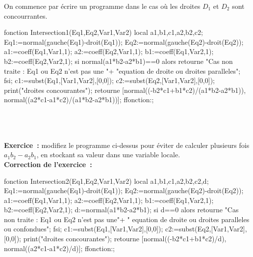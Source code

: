 \documentclass[12pt,a4paper]{book}
\begin{document}
\begin{giacjshere}
On commence par \'ecrire un programme dans le cas o\`u les droites
$D_1$ et $D_2$ sont concourrantes.
\begin{giacprog}
fonction Intersection1(Eq1,Eq2,Var1,Var2)
 local a1,b1,c1,a2,b2,c2;
 Eq1:=normal(gauche(Eq1)-droit(Eq1));
 Eq2:=normal(gauche(Eq2)-droit(Eq2));
 a1:=coeff(Eq1,Var1,1);
 a2:=coeff(Eq2,Var1,1);
 b1:=coeff(Eq1,Var2,1);
 b2:=coeff(Eq2,Var2,1);
 si normal(a1*b2-a2*b1)==0 alors
   retourne "Cas non traite : Eq1 ou Eq2 n'est pas une  "+
          "equation de droite ou droites paralleles"; 
 fsi;
 c1:=subst(Eq1,[Var1,Var2],[0,0]);
 c2:=subst(Eq2,[Var1,Var2],[0,0]);
 print("droites concourantes");
 retourne [normal((-b2*c1+b1*c2)/(a1*b2-a2*b1)),
           normal((a2*c1-a1*c2)/(a1*b2-a2*b1))];
ffonction:;
\end{giacprog}
\\
\\
\\

{\bf Exercice~:} modifiez le programme ci-dessus pour \'eviter de calculer
plusieurs fois $a_1b_2-a_2b_1$, en stockant sa valeur dans une variable 
locale.\\

{\bf Correction de l'exercice~:}
\begin{giacprog}
fonction Intersection2(Eq1,Eq2,Var1,Var2)
 local a1,b1,c1,a2,b2,c2,d;
 Eq1:=normal(gauche(Eq1)-droit(Eq1));
 Eq2:=normal(gauche(Eq2)-droit(Eq2));
 a1:=coeff(Eq1,Var1,1);
 a2:=coeff(Eq2,Var1,1);
 b1:=coeff(Eq1,Var2,1);
 b2:=coeff(Eq2,Var2,1);
 d:=normal(a1*b2-a2*b1);
 si d==0 alors
   retourne "Cas non traite : Eq1 ou Eq2 n'est pas une"+
    " equation de droite ou droites paralleles ou confondues"; 
 fsi;
 c1:=subst(Eq1,[Var1,Var2],[0,0]);
 c2:=subst(Eq2,[Var1,Var2],[0,0]);
 print("droites concourantes");
 retourne [normal((-b2*c1+b1*c2)/d),
           normal((a2*c1-a1*c2)/d)];
ffonction:;
\end{giacprog}
\\
\\


\end{giacjshere}
\end{document}
